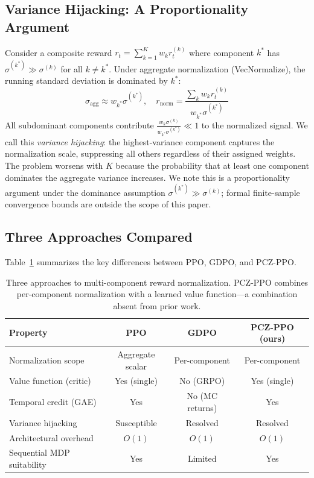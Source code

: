 \documentclass[11pt,a4paper]{article}
\begin{document}
\subsection{Variance Hijacking: A Proportionality Argument}
\label{sec:variance_hijacking}

Consider a composite reward $r_t = \sum_{k=1}^{K} w_k r_t^{(k)}$ where component $k^*$ has $\sigma^{(k^*)} \gg \sigma^{(k)}$ for all $k \neq k^*$. Under aggregate normalization (VecNormalize), the running standard deviation is dominated by $k^*$:
\begin{equation}
\sigma_{\text{agg}} \approx w_{k^*} \sigma^{(k^*)}, \quad r_{\text{norm}} = \frac{\sum_k w_k r_t^{(k)}}{w_{k^*} \sigma^{(k^*)}}
\end{equation}
All subdominant components contribute $\frac{w_k \sigma^{(k)}}{w_{k^*} \sigma^{(k^*)}} \ll 1$ to the normalized signal. We call this \emph{variance hijacking}: the highest-variance component captures the normalization scale, suppressing all others regardless of their assigned weights. The problem worsens with $K$ because the probability that at least one component dominates the aggregate variance increases. We note this is a proportionality argument under the dominance assumption $\sigma^{(k^*)} \gg \sigma^{(k)}$; formal finite-sample convergence bounds are outside the scope of this paper.

\subsection{Three Approaches Compared}

Table~\ref{tab:three_way} summarizes the key differences between PPO, GDPO, and PCZ-PPO.

\begin{table}[H]
\centering
\caption{Three approaches to multi-component reward normalization. PCZ-PPO combines per-component normalization with a learned value function---a combination absent from prior work.}
\label{tab:three_way}
\begin{tabular}{lccc}
\toprule
Property & PPO & GDPO & PCZ-PPO (ours) \\
\midrule
Normalization scope & Aggregate scalar & Per-component & Per-component \\
Value function (critic) & Yes (single) & No (GRPO) & Yes (single) \\
Temporal credit (GAE) & Yes & No (MC returns) & Yes \\
Variance hijacking & Susceptible & Resolved & Resolved \\
Architectural overhead & $O(1)$ & $O(1)$ & $O(1)$ \\
Sequential MDP suitability & Yes & Limited & Yes \\
\bottomrule
\end{tabular}
\end{table}
\end{document}
